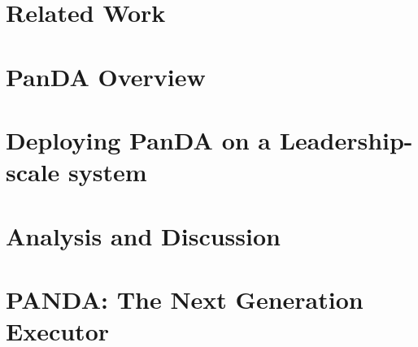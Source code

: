 \documentclass[sigconf, screen]{acmart}
\begin{document}
\section{Related Work}
\label{sec:related}

% 



\section{PanDA Overview}
\label{sec:panda_overview}




\section{Deploying PanDA on a Leadership-scale system}
\label{sec:panda_deployment}




\section{Analysis and Discussion}
\label{sec:panda_titan}




\section{PANDA\@: The Next Generation Executor}
\label{sec:panda_roadmap}
\end{document}
